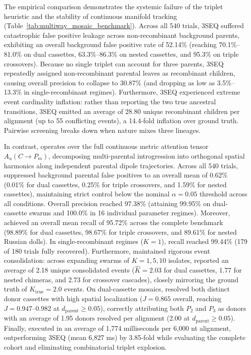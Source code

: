 The empirical comparison demonstrates the systemic failure of the triplet heuristic and the stability of continuous manifold tracking (Table~\ref{tab:multiway_mosaic_benchmark}).
Across all 540 trials, 3SEQ suffered catastrophic false positive leakage across non-recombinant background parents, exhibiting an overall background false positive rate of 52.14\% (reaching 70.1\%--81.0\% on dual cassettes, 63.3\%--86.3\% on nested cassettes, and 95.3\% on triple crossovers).
Because no single triplet can account for three parents, 3SEQ repeatedly assigned non-recombinant parental leaves as recombinant children, causing overall precision to collapse to 30.87\% (and dropping as low as 3.5\%--13.3\% in single-recombinant regimes).
Furthermore, 3SEQ experienced extreme event cardinality inflation: rather than reporting the two true ancestral transitions, 3SEQ emitted an average of 28.80 unique recombinant children per alignment (up to 55 conflicting events), a 14.4-fold inflation over ground truth.
Pairwise screening breaks down when nature mixes three lineages.

In contrast, \RhizAeon operates over the full continuous metric attention tensor $A_u(C \to P_m)$, decomposing multi-parental introgression into orthogonal spatial harmonics along independent parental dipole trajectories.
Across all 540 trials, \RhizAeon suppressed background parental false positives to an overall mean of 0.62\% (0.01\% for dual cassettes, 0.25\% for triple crossovers, and 1.59\% for nested cassettes), maintaining strict control below the nominal $\alpha = 0.05$ threshold across all conditions.
Overall precision reached 97.38\% (attaining 99.95\% on dual-cassette swarms and 100.0\% in 16 individual parameter regimes).
Moreover, \RhizAeon achieved an overall mean recall of 95.72\% across the complete benchmark (98.89\% for dual cassettes, 98.67\% for triple crossovers, and 89.61\% for nested Russian dolls).
In single-recombinant regimes ($K = 1$), recall reached 99.44\% (179 of 180 trials fully recovered).
Furthermore, \RhizAeon maintained rigorous event consolidation: across expanding swarms of $K = 1, 5, 10$ isolates, \RhizAeon reported an average of 2.18 unique consolidated events ($\hat{K} = 2.03$ for dual cassettes, 1.77 for nested chimeras, and 2.73 for crossover cascades), closely mirroring the ground truth of $K_{\text{true}} = 2.0$ events.
On dual-cassette mosaics, \RhizAeon resolved both distinct donor cassettes with high spatial localization ($J = 0.865$ overall, reaching $J = 0.947\text{--}0.982$ at $d_{\text{parent}} \ge 0.05$), correctly attributing both $P_2$ and $P_3$ as donors with an average of 1.95 donors resolved per alignment (2.00 at $d_{\text{parent}} \ge 0.05$).
Finally, \RhizAeon executed in an average of 1,774 milliseconds per 6,000 nt alignment, outperforming 3SEQ (mean 6,827 ms) by 3.85-fold while evaluating the complete cohort and eliminating combinatorial triplet explosion.

